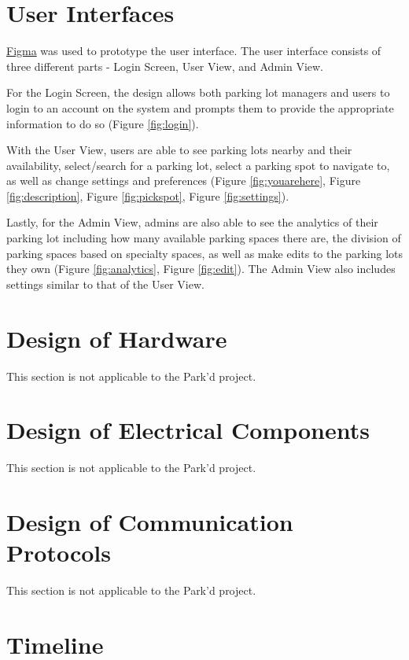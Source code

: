 \documentclass[12pt, titlepage]{article}
\begin{document}
\section{User Interfaces} 

\href{https://www.figma.com/file/LglAu6OBHHntlaihSaGUhv/DESIGN-DRAFT?node-id=0%3A1&t=lYDORXYJa3TJiJ7X-1}{Figma}
was used to prototype the user interface. The user interface consists of three
different parts - Login Screen, User View, and Admin View.

For the Login Screen, the design allows both parking lot managers and users to
login to an account on the system and prompts them to provide the appropriate
information to do so (Figure \ref{fig:login}).

With the User View, users are able to see parking lots nearby and their
availability, select/search for a parking lot, select a parking spot to navigate
to, as well as change settings and preferences (Figure \ref{fig:youarehere},
Figure \ref{fig:description}, Figure \ref{fig:pickspot}, Figure
\ref{fig:settings}).

Lastly, for the Admin View, admins are also able to see the analytics of their
parking lot including how many available parking spaces there are, the division
of parking spaces based on specialty spaces, as well as make edits to the
parking lots they own (Figure \ref{fig:analytics}, Figure \ref{fig:edit}). The
Admin View also includes settings similar to that of the User View.

\section{Design of Hardware}

This section is not applicable to the Park'd project.

\section{Design of Electrical Components}

This section is not applicable to the Park'd project.

\section{Design of Communication Protocols}

This section is not applicable to the Park'd project.

\newpage
\section{Timeline}
\end{document}
